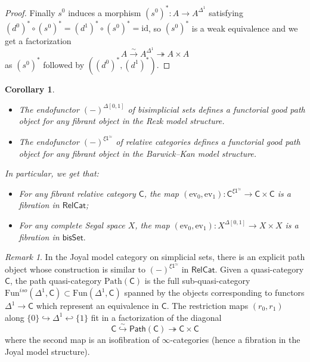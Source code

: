 \documentclass[a4paper,12pt]{amsart}
\theoremstyle{plain}
\newtheorem{corollary}[theorem]{Corollary}%
\theoremstyle{definition}
\theoremstyle{remark}
\newtheorem{remark}[theorem]{\sc Remark}%
\begin{document}
\begin{proof}

Finally $s^0$ induces a morphism $(s^0)^*:A\rightarrow A^{\Delta^1}$ satisfying $(d^0)^*\circ (s^0)^* = (d^1)^*\circ (s^0)^* = \mathrm{id}$, so $(s^0)^*$ is a weak equivalence and we get a factorization
\[
A\stackrel{\sim}{\rightarrow} A^{\Delta^1}\twoheadrightarrow A\times A
\]
as $(s^0)^*$ followed by $((d^0)^*,(d^1)^*)$. 
\end{proof}

\begin{corollary}\label{cor:evaluationfibration}\leavevmode

\begin{itemize}
    \item[(1)] The endofunctor $(-)^{\Delta[0,1]}$ of bisimplicial sets defines a functorial good path object for any fibrant object in the Rezk model structure. 


    \item[(2)]  The endofunctor $(-)^{\xi\mathsf{1}^{\simeq}}$ of relative categories defines a functorial good path object for any fibrant object in the Barwick--Kan model structure.
\end{itemize}


In particular, we get that:

 
\begin{itemize}
\item[(1)] For any fibrant relative category $\mathsf{C}$, the map  $(\mathrm{ev}_0,\mathrm{ev}_1):\mathsf{C}^{\xi\mathsf{1}^{\simeq}}\rightarrow \mathsf{C}\times \mathsf{C}$ is a fibration in $\mathsf{RelCat}$;


\item[(2)] For any complete Segal space $X$, the map  $(\mathrm{ev}_0,\mathrm{ev}_1):X^{\Delta[0,1]}\rightarrow X\times X$ is a fibration in $\mathsf{bisSet}.$
\end{itemize}
\end{corollary}

\begin{remark}\label{rem: quasicatpath}
In the Joyal model category on simplicial sets, there is an explicit path object whose construction is similar to $(-)^{\xi\mathsf{1}^{\simeq}}$ in $\mathsf{RelCat}$. Given a quasi-category $\mathsf{C}$, the path quasi-category $\mathrm{Path}(\mathsf{C})$ is the full sub-quasi-category $\mathrm{Fun}^{iso}(\Delta^1,\mathsf{C})\subset \mathrm{Fun}(\Delta^1,\mathsf{C})$ spanned by the objects corresponding to functors $\Delta^1\rightarrow \mathsf{C}$ which represent an equivalence in $\mathsf{C}$. The restriction maps $(r_0,r_1)$ along $\{0\}\hookrightarrow \Delta^1\hookleftarrow \{1\}$ fit in a factorization of the diagonal
\[
\mathsf{C}\stackrel{\sim}{\hookrightarrow} \textsf{Path}(\mathsf{C})\twoheadrightarrow\mathsf{C}\times\mathsf{C}
\]
where the second map is an isofibration of $\infty$-categories (hence a fibration in the Joyal model structure).
\end{remark}
\end{document}
